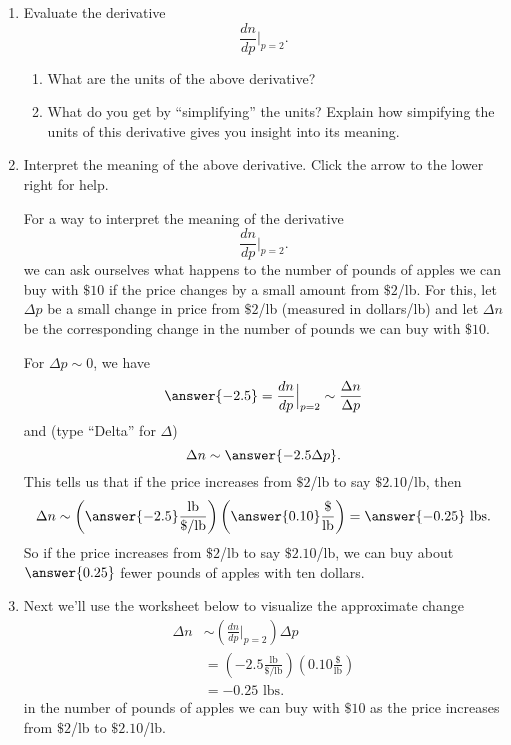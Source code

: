 \documentclass{ximera}
\begin{document}
\begin{question}
\begin{enumerate}
\item Evaluate the derivative 
\[
         \frac{dn}{dp} \Big|_{p=2} . 
\]

\begin{enumerate}
\item What are the units of the above derivative?

\item What do you get by ``simplifying'' the units? Explain how simpifying the units of this derivative gives you insight into its meaning.

\end{enumerate}

\item Interpret the meaning of the above derivative. Click the arrow to the lower right for help.

\begin{expandable}

For a way to interpret the meaning of the derivative 
\[
         \frac{dn}{dp} \Big|_{p=2} . 
\]
we can ask ourselves what happens to the number of pounds of apples we can buy with $\$10$ if the price changes by a small amount from $\$2$/lb. For this, let $\Delta p$ be a small change in price from $\$2$/lb (measured in dollars/lb) and let $\Delta n$ be the corresponding change in the number of pounds we can buy with $\$10$.

For $\Delta p \sim 0$, we have
\[
    \answer{-2.5} =  \frac{dn}{dp} \Big|_{p=2} \sim \frac{\Delta n}{\Delta p} 
\]
and (type ``Delta'' for $\Delta$)
\[
     \Delta n \sim   \answer{-2.5 \Delta p}.
\]
This tells us that if the price increases from $\$2$/lb to say $\$2.10$/lb, then 
\[
   \Delta n \sim \left( \answer{-2.5} \frac{\text{lb}}{\$/\text{lb}} \right) \left( \answer{0.10} \frac{\$}{\text{lb}}  \right) =                        \answer{-0.25}\text{ lbs}.
\]
So if the price increases from $\$2$/lb to say $\$2.10$/lb, we can buy about $\answer{0.25}$ fewer pounds of apples with ten dollars. 

\end{expandable}

\item Next we'll use the worksheet below to visualize the approximate change
\begin{align*}
  \Delta n     & \sim  \left( \frac{dn}{dp}\Big|_{p=2} \right)\Delta p \\
                   &=  \left( -2.5\frac{\text{lb}}{\$/\text{lb}} \right) \left( 0.10 \frac{\$}{\text{lb}}  \right)  \\
                   &=   -0.25\text{ lbs}.
\end{align*}
in the number of pounds of apples we can buy with $\$10$ as the price increases from $\$2$/lb to $\$2.10$/lb. 




\end{enumerate}
\end{question}
\end{document}
